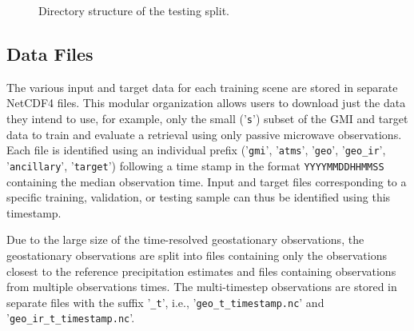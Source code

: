 \documentclass[11pt]{article}
\begin{document}
\begin{figure}[htbp] %


	\caption{
    Directory structure of the testing split.
	}
	\label{fig:testing_organization}
\end{figure}

\subsection{Data Files}

The various input and target data for each training scene are stored in separate
NetCDF4 files. This modular organization allows users to download just the data
they intend to use, for example, only the small ('\texttt{s}') subset of the GMI
and target data to train and evaluate a retrieval using only passive microwave
observations. Each file is identified using an individual prefix
('\texttt{gmi}', '\texttt{atms}', '\texttt{geo}', '\texttt{geo\_ir}',
'\texttt{ancillary}', '\texttt{target}') following a time stamp in the format
\texttt{YYYYMMDDHHMMSS} containing the median observation time. Input and target
files corresponding to a specific training, validation, or testing sample can
thus be identified using this timestamp.

Due to the large size of the time-resolved geostationary observations, the
geostationary observations are split into files containing only the observations
closest to the reference precipitation estimates and files containing
observations from multiple observations times. The multi-timestep observations
are stored in separate files with the suffix '\texttt{\_t}', i.e.,
'\texttt{geo\_t\_\textlangle timestamp\textrangle.nc}' and '\texttt{geo\_ir\_t\_\textlangle timestamp\textrangle.nc}'.
\end{document}
